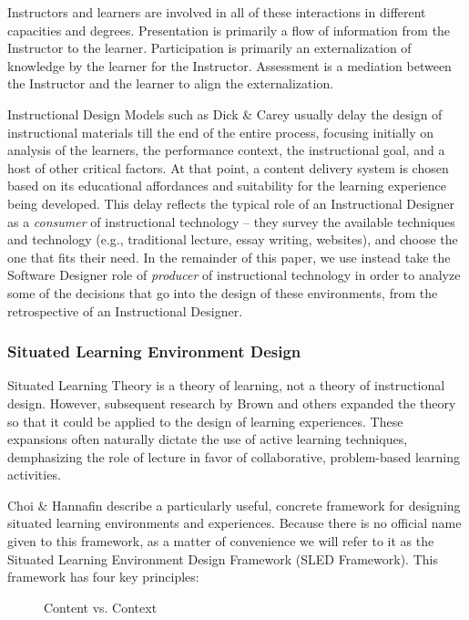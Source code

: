 Instructors and learners are involved in all of these interactions in different capacities and degrees. Presentation is primarily a flow of information from the Instructor to the learner. Participation is primarily an externalization of knowledge by the learner for the Instructor. Assessment is a mediation between the Instructor and the learner to align the externalization.

Instructional Design Models such as Dick \& Carey usually delay the design of instructional materials till the end of the entire process, focusing initially on analysis of the learners, the performance context, the instructional goal, and a host of other critical factors. At that point, a content delivery system is chosen based on its educational affordances and suitability for the learning experience being developed. This delay reflects the typical role of an Instructional Designer as a \textit{consumer} of instructional technology -- they survey the available techniques and technology (e.g., traditional lecture, essay writing, websites), and choose the one that fits their need. In the remainder of this paper, we use instead take the Software Designer role of \textit{producer} of instructional technology in order to analyze some of the decisions that go into the design of these environments, from the retrospective of an Instructional Designer.

\subsubsection{Situated Learning Environment Design}

Situated Learning Theory is a theory of learning, not a theory of instructional design. However, subsequent research by Brown \cite{brown1989situated} and others expanded the theory so that it could be applied to the design of learning experiences. These expansions often naturally dictate the use of active learning techniques, demphasizing the role of lecture in favor of collaborative, problem-based learning activities.

Choi \& Hannafin \cite{situated-cognition} describe a particularly useful, concrete framework for designing situated learning environments and experiences. Because there is no official name given to this framework, as a matter of convenience we will refer to it as the Situated Learning Environment Design Framework (SLED Framework). This framework has four key principles:

\begin{wrapfigure}{R}{0.5\textwidth}
		\begin{center}
		\end{center}
		\caption{Content vs. Context}
		\label{fig-content-context}
\end{wrapfigure}

